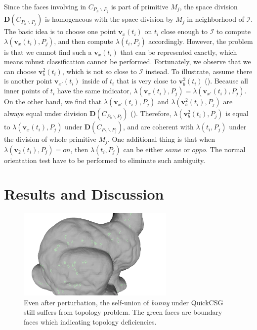\documentclass[10pt,journal,compsoc]{IEEEtran}
\begin{document}
Since the faces involving in $C_{P_h \backslash P_j}$ is part of primitive $M_j$, the space division $\boldsymbol{D}(C_{P_h \backslash P_j})$ is homogeneous with the space division by $M_j$ in neighborhood of $\bm{\mathcal{I}}$. The basic idea is to choose one point $\bm{v}_x(t_i)$ on $t_i$ close enough to $\bm{\mathcal{I}}$ to compute $\lambda(\bm{v}_x(t_i), P_j)$, and then compute $\lambda(t_i, P_j)$ accordingly. However, the problem is that we cannot find such a $\bm{v}_x(t_i)$ that can be represented exactly, which means robust classification cannot be performed. Fortunately, we observe that we can choose $\bm{v}_b^2(t_i)$, which is not so close to $\bm{\mathcal{I}}$ instead. To illustrate, assume there is another point $\bm{v}_{x'}(t_i)$ inside of $t_i$ that is very close to $\bm{v}_b^2(t_i)$ ({\color{red}{Fig. x}}). Because all inner points of $t_i$ have the same indicator, $\lambda(\bm{v}_x(t_i), P_j) = \lambda(\bm{v}_{x'}(t_i), P_j)$. On the other hand, we find that $\lambda(\bm{v}_{x'}(t_i), P_j)$ and $\lambda(\bm{v}_b^2(t_i), P_j)$ are always equal under division $\boldsymbol{D}(C_{P_h \backslash P_j})$ ({}). Therefore, $\lambda(\bm{v}_b^2(t_i), P_j)$ is equal to $\lambda(\bm{v}_x(t_i), P_j)$ under $\boldsymbol{D}(C_{P_h \backslash P_j})$, and are coherent with $\lambda(t_i, P_j)$ under the division of whole primitive $M_j$. One additional thing is that when $\lambda(\bm{v}_2(t_i), P_j)=on$, then $\lambda(t_i, P_j)$ can be either $same$ or $oppo$. The normal orientation test have to be performed to eliminate such ambiguity.

\fi

\section{Results and Discussion}


\begin{figure}[t]
\centering
\includegraphics[width=3in]{perturb}
\caption{Even after perturbation, the self-union of \emph{bunny} under QuickCSG still suffers from topology problem. The green faces are boundary faces which indicating topology deficiencies.}
\label{fig:boundaryedge}
\end{figure}
\end{document}
